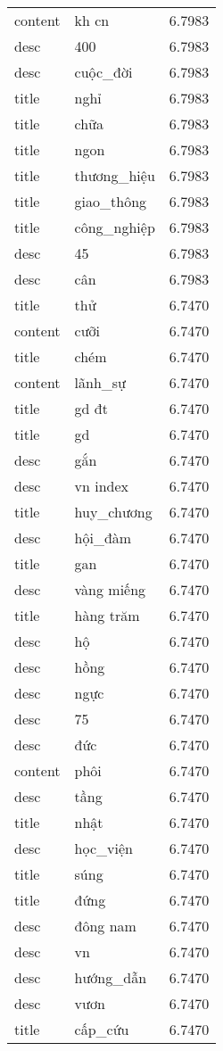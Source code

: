 \documentclass{article}
\begin{document}
\begin{tabular}{lll}
content & kh cn & 6.7983\\
desc & 400 & 6.7983\\
desc & cuộc\_đời & 6.7983\\
title & nghỉ & 6.7983\\
title & chữa & 6.7983\\
title & ngon & 6.7983\\
title & thương\_hiệu & 6.7983\\
title & giao\_thông & 6.7983\\
title & công\_nghiệp & 6.7983\\
desc & 45 & 6.7983\\
desc & cân & 6.7983\\
title & thử & 6.7470\\
content & cưỡi & 6.7470\\
title & chém & 6.7470\\
content & lãnh\_sự & 6.7470\\
title & gd đt & 6.7470\\
title & gd & 6.7470\\
desc & gắn & 6.7470\\
desc & vn index & 6.7470\\
title & huy\_chương & 6.7470\\
desc & hội\_đàm & 6.7470\\
title & gan & 6.7470\\
desc & vàng miếng & 6.7470\\
title & hàng trăm & 6.7470\\
desc & hộ & 6.7470\\
desc & hồng & 6.7470\\
desc & ngực & 6.7470\\
desc & 75 & 6.7470\\
desc & đức & 6.7470\\
content & phôi & 6.7470\\
desc & tầng & 6.7470\\
title & nhật & 6.7470\\
desc & học\_viện & 6.7470\\
title & súng & 6.7470\\
title & đứng & 6.7470\\
desc & đông nam & 6.7470\\
desc & vn & 6.7470\\
desc & hướng\_dẫn & 6.7470\\
desc & vươn & 6.7470\\
title & cấp\_cứu & 6.7470\\

\end{tabular}
\end{document}

